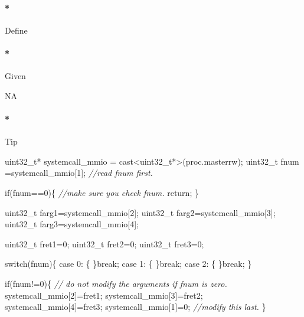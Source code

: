 \documentclass[]{article}
\newenvironment{Shaded}{}{}
\newcommand{\DataTypeTok}[1]{\textcolor[rgb]{0.50,0.00,0.00}{{#1}}}
\newcommand{\DecValTok}[1]{\textcolor[rgb]{0.00,0.00,1.00}{{#1}}}
\newcommand{\CommentTok}[1]{\textcolor[rgb]{0.50,0.50,0.50}{\textit{{#1}}}}
\newcommand{\ControlFlowTok}[1]{{#1}}
\newcommand{\NormalTok}[1]{{#1}}
\let\oldparagraph\paragraph
\renewcommand{\paragraph}[1]{\oldparagraph{#1}\mbox{}}
\begin{document}
\paragraph*{Define}\label{define-12}

\paragraph*{Given}\label{given-12}

NA

\paragraph*{Tip}\label{tip-12}

\begin{Shaded}
\begin{Highlighting}[]
  \DataTypeTok{uint32_t}\NormalTok{* systemcall_mmio = cast<}\DataTypeTok{uint32_t}\NormalTok{*>(proc.masterrw);}
  \DataTypeTok{uint32_t} \NormalTok{fnum =systemcall_mmio[}\DecValTok{1}\NormalTok{];  }\CommentTok{//read fnum first.}

  \ControlFlowTok{if}\NormalTok{(fnum==}\DecValTok{0}\NormalTok{)\{ }\CommentTok{//make sure you check fnum.}
    \ControlFlowTok{return}\NormalTok{;}
  \NormalTok{\}}

  \DataTypeTok{uint32_t} \NormalTok{farg1=systemcall_mmio[}\DecValTok{2}\NormalTok{];}
  \DataTypeTok{uint32_t} \NormalTok{farg2=systemcall_mmio[}\DecValTok{3}\NormalTok{];}
  \DataTypeTok{uint32_t} \NormalTok{farg3=systemcall_mmio[}\DecValTok{4}\NormalTok{];}

  \DataTypeTok{uint32_t} \NormalTok{fret1=}\DecValTok{0}\NormalTok{;}
  \DataTypeTok{uint32_t} \NormalTok{fret2=}\DecValTok{0}\NormalTok{;}
  \DataTypeTok{uint32_t} \NormalTok{fret3=}\DecValTok{0}\NormalTok{;}

  \ControlFlowTok{switch}\NormalTok{(fnum)\{}
  \ControlFlowTok{case} \DecValTok{0}\NormalTok{: \{}
          \NormalTok{\}}\ControlFlowTok{break}\NormalTok{;}
  \ControlFlowTok{case} \DecValTok{1}\NormalTok{: \{}
          \NormalTok{\}}\ControlFlowTok{break}\NormalTok{;}
  \ControlFlowTok{case} \DecValTok{2}\NormalTok{: \{}
          \NormalTok{\}}\ControlFlowTok{break}\NormalTok{;}
  \NormalTok{\}}


  \ControlFlowTok{if}\NormalTok{(fnum!=}\DecValTok{0}\NormalTok{)\{}
    \CommentTok{// do not modify the arguments if fnum is zero.}
    \NormalTok{systemcall_mmio[}\DecValTok{2}\NormalTok{]=fret1;}
    \NormalTok{systemcall_mmio[}\DecValTok{3}\NormalTok{]=fret2;}
    \NormalTok{systemcall_mmio[}\DecValTok{4}\NormalTok{]=fret3;}
    \NormalTok{systemcall_mmio[}\DecValTok{1}\NormalTok{]=}\DecValTok{0}\NormalTok{; }\CommentTok{//modify this last.}
  \NormalTok{\}}


\end{Highlighting}
\end{Shaded}
\end{document}
